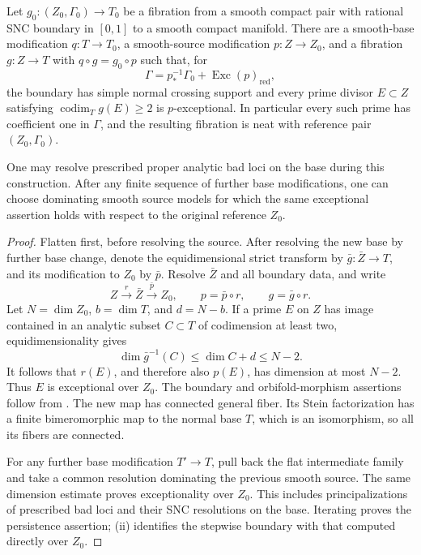 \begin{lemma}
\label{setup:flattening}
Let $g_0:(Z_0,\Gamma_0)\to T_0$ be a fibration from a smooth compact
pair with rational SNC boundary in $[0,1]$ to a smooth compact manifold.
There are a smooth-base modification
$q:T\to T_0$, a smooth-source modification $p:Z\to Z_0$, and a
fibration $g:Z\to T$ with $q\circ g=g_0\circ p$ such that, for
\[
 \Gamma=p_*^{-1}\Gamma_0+\operatorname{Exc}(p)_{\mathrm{red}},
\]
the boundary has simple normal crossing support and every prime divisor
$E\subset Z$ satisfying $\operatorname{codim}_Tg(E)\geq2$ is
$p$-exceptional. In particular every such prime has coefficient one in
$\Gamma$, and the resulting fibration is neat with reference pair
$(Z_0,\Gamma_0)$.

One may resolve prescribed proper analytic bad loci on the base during
this construction. After any finite sequence of further base
modifications, one can choose dominating smooth source models for which
the same exceptional assertion holds with respect to the original
reference $Z_0$.
\end{lemma}

\begin{proof}
Flatten first, before resolving the source. After resolving the new base
by further base change, denote the equidimensional strict transform by
$\bar g:\bar Z\to T$, and its modification to $Z_0$ by $\bar p$.
Resolve $\bar Z$ and all boundary data, and write
\[
 Z\xrightarrow{r}\bar Z\xrightarrow{\bar p}Z_0,
 \qquad p=\bar p\circ r,
 \qquad g=\bar g\circ r.
\]
Let $N=\dim Z_0$, $b=\dim T$, and $d=N-b$. If a prime $E$ on $Z$
has image contained in an analytic subset $C\subset T$ of codimension
at least two, equidimensionality gives
\[
 \dim\bar g^{-1}(C)\leq\dim C+d\leq N-2.
\]
It follows that $r(E)$, and therefore also $p(E)$, has dimension at most
$N-2$. Thus $E$ is exceptional over $Z_0$. The boundary and
orbifold-morphism assertions follow from .
The new map has connected general fiber.
Its Stein factorization has a finite bimeromorphic map to the normal
base $T$, which is an isomorphism, so all its fibers are connected.

For any further base modification $T'\to T$, pull back the flat
intermediate family and take a common resolution dominating the previous
smooth source. The same dimension estimate proves exceptionality over
$Z_0$. This includes principalizations of prescribed bad loci and their
SNC resolutions on the base. Iterating proves the persistence assertion;
\textup{(ii)} identifies the
stepwise boundary with that computed directly over $Z_0$.
\end{proof}

